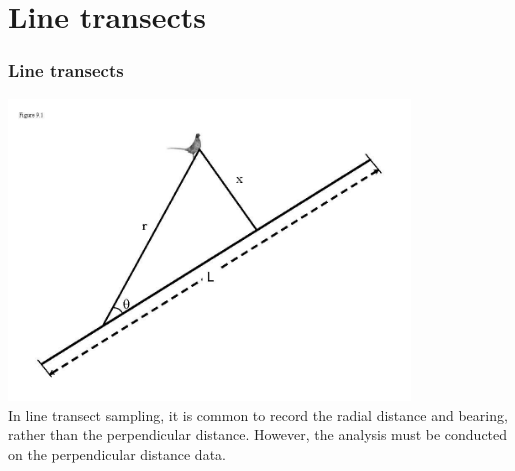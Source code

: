 \documentclass[color=usenames,dvipsnames,handout]{beamer}\usepackage[]{graphicx}\usepackage[]{xcolor}
\begin{document}
\section{Line transects}



\begin{frame}
  \frametitle{Line transects}
  \centering
  \includegraphics[width=0.8\textwidth]{figs/Fig9-1} \\
  In line transect sampling, it is common to record the radial
  distance and bearing, rather than the perpendicular
  distance. However, the analysis must be conducted on the
  perpendicular distance data. \\
\end{frame}
\end{document}
